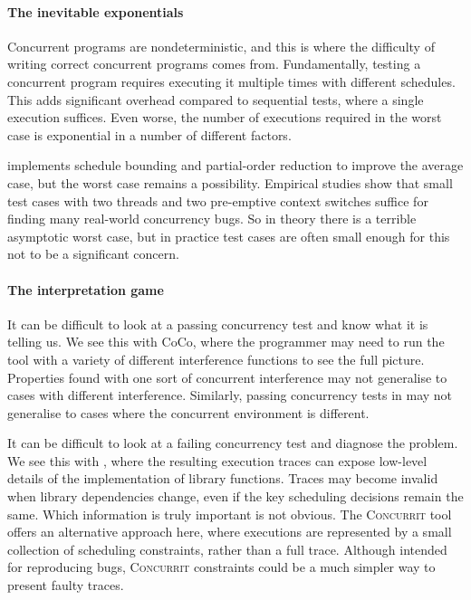 \paragraph{The inevitable exponentials}
Concurrent programs are nondeterministic, and this is where the
difficulty of writing correct concurrent programs comes from.
Fundamentally, testing a concurrent program requires executing it
multiple times with different schedules.  This adds significant
overhead compared to sequential tests, where a single execution
suffices.  Even worse, the number of executions required in the worst
case is exponential in a number of different
factors\cite{musuvathi2007}.

\dejafu{} implements schedule
bounding\cite{emmi2011,musuvathi2008,musuvathi2007} and partial-order
reduction\cite{flanagan2005,godefroid1996} to improve the average
case, but the worst case remains a possibility.  Empirical studies
show that small test cases with two threads and two pre-emptive
context switches suffice for finding many real-world concurrency
bugs\cite{thomson2014}.  So in theory there is a terrible asymptotic
worst case, but in practice test cases are often small enough for this
not to be a significant concern.

\paragraph{The interpretation game}
It can be difficult to look at a passing concurrency test and know
what it is telling us.  We see this with CoCo, where the programmer
may need to run the tool with a variety of different interference
functions to see the full picture.  Properties found with one sort of
concurrent interference may not generalise to cases with different
interference.  Similarly, passing concurrency tests in \dejafu{} may
not generalise to cases where the concurrent environment is different.

It can be difficult to look at a failing concurrency test and diagnose
the problem.  We see this with \dejafu{}, where the resulting
execution traces can expose low-level details of the implementation of
library functions.  Traces may become invalid when library
dependencies change, even if the key scheduling decisions remain the
same.  Which information is truly important is not obvious.  The
\textsc{Concurrit}\cite{elmas2013} tool offers an alternative approach
here, where executions are represented by a small collection of
scheduling constraints, rather than a full trace.  Although intended
for reproducing bugs, \textsc{Concurrit} constraints could be a much
simpler way to present faulty traces.

